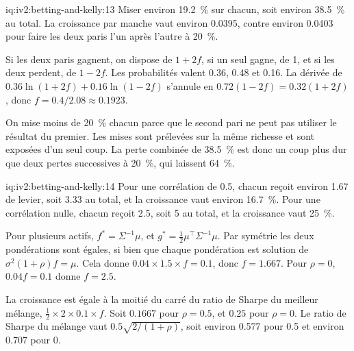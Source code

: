 \begin{solution}{iq:iv2:betting-and-kelly:13}
Miser environ 19.2~\% sur chacun, soit environ 38.5~\% au total. La croissance par manche vaut environ 0.0395, contre environ 0.0403 pour faire les deux paris l'un après l'autre à 20~\%.

Si les deux paris gagnent, on dispose de $1 + 2f$, si un seul gagne, de 1, et si les deux perdent, de $1 - 2f$. Les probabilités valent 0.36, 0.48 et 0.16. La dérivée de $0.36\ln(1 + 2f) + 0.16\ln(1 - 2f)$ s'annule en $0.72(1 - 2f) = 0.32(1 + 2f)$, donc $f = 0.4/2.08 \approx 0.1923$.

On mise moins de 20~\% chacun parce que le second pari ne peut pas utiliser le résultat du premier. Les mises sont prélevées sur la même richesse et sont exposées d'un seul coup. La perte combinée de 38.5~\% est donc un coup plus dur que deux pertes successives à 20~\%, qui laissent 64~\%.

\end{solution}

\begin{solution}{iq:iv2:betting-and-kelly:14}
Pour une corrélation de 0.5, chacun reçoit environ 1.67 de levier, soit 3.33 au total, et la croissance vaut environ 16.7~\%. Pour une corrélation nulle, chacun reçoit 2.5, soit 5 au total, et la croissance vaut 25~\%.

Pour plusieurs actifs, $f^* = \Sigma^{-1}\mu$, et $g^* = \tfrac12\mu^\top\Sigma^{-1}\mu$. Par symétrie les deux pondérations sont égales, si bien que chaque pondération est solution de $\sigma^2(1 + \rho)f = \mu$. Cela donne $0.04 \times 1.5 \times f = 0.1$, donc $f = 1.667$. Pour $\rho = 0$, $0.04f = 0.1$ donne $f = 2.5$.

La croissance est égale à la moitié du carré du ratio de Sharpe du meilleur mélange, $\tfrac12 \times 2 \times 0.1 \times f$. Soit $0.1667$ pour $\rho = 0.5$, et $0.25$ pour $\rho = 0$. Le ratio de Sharpe du mélange vaut $0.5\sqrt{2/(1 + \rho)}$, soit environ 0.577 pour 0.5 et environ 0.707 pour 0.

\end{solution}

